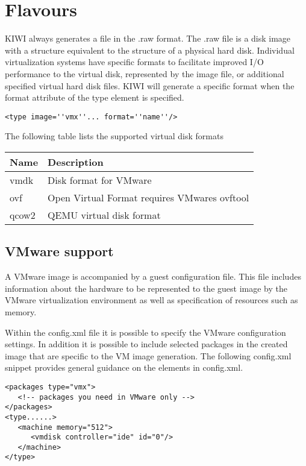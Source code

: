 \section{Flavours}

KIWI always generates a file in the .raw format. The .raw file is a disk
image with a structure equivalent to the structure of a physical hard disk. 
Individual virtualization systems have specific formats to facilitate
improved I/O performance to the virtual disk, represented by the image file,
or additional specified virtual hard disk files. KIWI will generate a 
specific format when the format attribute of the type element is specified.


\begin{Command}{12cm}
\begin{verbatim}
<type image=''vmx''... format=''name''/>
\end{verbatim}
\end{Command}

The following table lists the supported virtual disk formats

\begin{tabular}[h]{|p{2cm}|p{9cm}|}
\hline
\textbf{Name} & \textbf{Description} \\
\hline
vmdk        & Disk format for VMware \\
ovf         & Open Virtual Format requires VMwares ovftool \\
qcow2       & QEMU virtual disk format  \\
\hline
\end{tabular}

\subsection{VMware support}

A VMware image is accompanied by a guest configuration file. This file 
includes information about the hardware to be represented to the guest 
image by the VMware virtualization environment as well as specification
of resources such as memory. 

Within the config.xml file it is possible to specify the VMware configuration
settings. In addition it is possible to include selected packages in the 
created image that are specific to the VM image generation. The following
config.xml snippet provides general guidance on the elements in config.xml.

\begin{Command}{13cm}
\begin{verbatim}
<packages type="vmx">
   <!-- packages you need in VMware only -->
</packages>
<type......>
   <machine memory="512">
      <vmdisk controller="ide" id="0"/>
   </machine>
</type>
\end{verbatim}
\end{Command}

